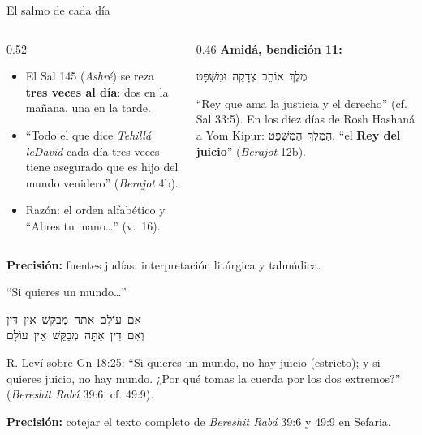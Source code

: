 \documentclass[hyperref={bookmarks=false},aspectratio=169]{beamer}
\newcommand{\heb}[1]{\mbox{\foreignlanguage{hebrew}{#1}}}
\newcommand{\destacar}[1]{\textbf{\textcolor{azul}{#1}}}
\newcommand{\precision}[1]{{\footnotesize\color{gris}\textbf{Precisión:} #1}}
\begin{document}
\begin{frame}{El salmo de cada día}
\begin{columns}[c,onlytextwidth]
\begin{column}{0.52\textwidth}\small
\begin{itemize}
\item El Sal 145 (\emph{Ashré}) se reza \destacar{tres veces al día}: dos en la mañana, una en la tarde.
\item ``Todo el que dice \emph{Tehillá leDavid} cada día tres veces tiene asegurado que es hijo del mundo venidero'' (\emph{Berajot} 4b).
\item Razón: el orden alfabético y ``Abres tu mano\ldots'' (v.~16).
\end{itemize}
\end{column}
\begin{column}{0.46\textwidth}\small
\textbf{\color{azul}Amidá, bendición 11:}
\begin{center}\heb{מֶלֶךְ אוֹהֵב צְדָקָה וּמִשְׁפָּט}\end{center}
``Rey que ama la justicia y el derecho'' (cf. Sal 33:5). En los diez días de Rosh Hashaná a Yom Kipur: \heb{הַמֶּלֶךְ הַמִּשְׁפָּט}, ``el \destacar{Rey del juicio}'' (\emph{Berajot} 12b).
\end{column}
\end{columns}\par\medskip
\precision{fuentes judías: interpretación litúrgica y talmúdica.}
\end{frame}

\begin{frame}{``Si quieres un mundo\ldots''}
\begin{center}\heb{אִם עוֹלָם אַתָּה מְבַקֵּשׁ אֵין דִּין}\\[2pt]\heb{וְאִם דִּין אַתָּה מְבַקֵּשׁ אֵין עוֹלָם}\end{center}
\small R. Leví sobre Gn 18:25: ``Si quieres un mundo, no hay juicio (estricto); y si quieres juicio, no hay mundo. ¿Por qué tomas la cuerda por los dos extremos?'' (\emph{Bereshit Rabá} 39:6; cf. 49:9).\par\medskip
\centering
{}\par
\precision{cotejar el texto completo de \emph{Bereshit Rabá} 39:6 y 49:9 en Sefaria.}
\end{frame}
\end{document}
